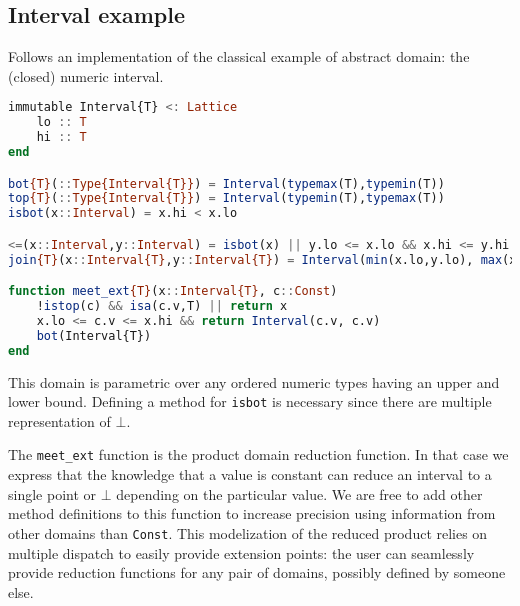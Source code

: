\documentclass[11pt]{article}
\begin{document}
\subsection*{Interval example}
Follows an implementation of the classical example of abstract domain: the (closed) numeric interval.
\begin{singlespace}
\begin{lstlisting}[language=julia]
immutable Interval{T} <: Lattice
    lo :: T
    hi :: T
end

bot{T}(::Type{Interval{T}}) = Interval(typemax(T),typemin(T))
top{T}(::Type{Interval{T}}) = Interval(typemin(T),typemax(T))
isbot(x::Interval) = x.hi < x.lo

<=(x::Interval,y::Interval) = isbot(x) || y.lo <= x.lo && x.hi <= y.hi
join{T}(x::Interval{T},y::Interval{T}) = Interval(min(x.lo,y.lo), max(x.hi,y.hi))

function meet_ext{T}(x::Interval{T}, c::Const)
    !istop(c) && isa(c.v,T) || return x
    x.lo <= c.v <= x.hi && return Interval(c.v, c.v)
    bot(Interval{T})
end
\end{lstlisting}
\end{singlespace}

This domain is parametric over any ordered numeric types having an upper and lower bound. Defining a method for \verb~isbot~ is necessary since there are multiple representation of $\bot$.

The \verb~meet_ext~ function is the product domain reduction function. In that case we express that the knowledge that a value is constant can reduce an interval to a single point or $\bot$ depending on the particular value. We are free to add other method definitions to this function to increase precision using information from other domains than \verb~Const~. This modelization of the reduced product relies on multiple dispatch to easily provide extension points: the user can seamlessly provide reduction functions for any pair of domains, possibly defined by someone else.
\end{document}
